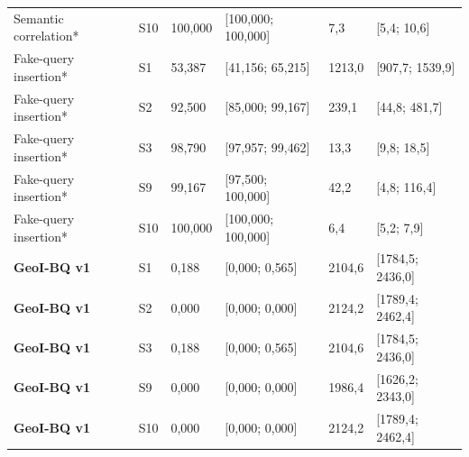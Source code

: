 \begin{tabularx}{\linewidth}{@{}P{3.4cm}P{.7cm}XXXX@{}}
Semantic correlation* & S10 & 100{,}000 & [100{,}000; 100{,}000] & 7{,}3 & [5{,}4; 10{,}6] \\
Fake-query insertion* & S1 & 53{,}387 & [41{,}156; 65{,}215] & 1213{,}0 & [907{,}7; 1539{,}9] \\
Fake-query insertion* & S2 & 92{,}500 & [85{,}000; 99{,}167] & 239{,}1 & [44{,}8; 481{,}7] \\
Fake-query insertion* & S3 & 98{,}790 & [97{,}957; 99{,}462] & 13{,}3 & [9{,}8; 18{,}5] \\
Fake-query insertion* & S9 & 99{,}167 & [97{,}500; 100{,}000] & 42{,}2 & [4{,}8; 116{,}4] \\
Fake-query insertion* & S10 & 100{,}000 & [100{,}000; 100{,}000] & 6{,}4 & [5{,}2; 7{,}9] \\
\textbf{GeoI-BQ v1} & S1 & 0{,}188 & [0{,}000; 0{,}565] & 2104{,}6 & [1784{,}5; 2436{,}0] \\
\textbf{GeoI-BQ v1} & S2 & 0{,}000 & [0{,}000; 0{,}000] & 2124{,}2 & [1789{,}4; 2462{,}4] \\
\textbf{GeoI-BQ v1} & S3 & 0{,}188 & [0{,}000; 0{,}565] & 2104{,}6 & [1784{,}5; 2436{,}0] \\
\textbf{GeoI-BQ v1} & S9 & 0{,}000 & [0{,}000; 0{,}000] & 1986{,}4 & [1626{,}2; 2343{,}0] \\
\textbf{GeoI-BQ v1} & S10 & 0{,}000 & [0{,}000; 0{,}000] & 2124{,}2 & [1789{,}4; 2462{,}4] \\
\bottomrule\end{tabularx}\par\smallskip
